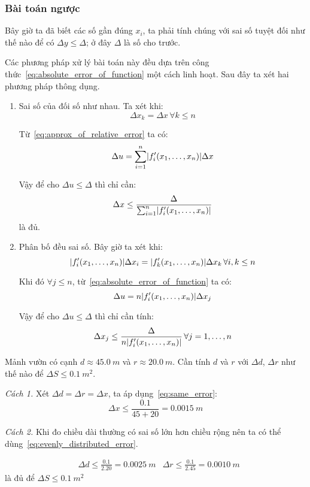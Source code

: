 \documentclass[../../Lectures.tex]{subfiles}
\begin{document}
\subsubsection{Bài toán ngược}

Bây giờ ta đã biết các số gần đúng \(x_i\), ta phải tính chúng với sai số tuyệt
đối như thế nào để có \(\Delta y \leq \Delta\); ở đây \(\Delta\) là số cho
trước.

Các phương pháp xử lý bài toán này đều dựa trên công thức~\ref{eq:absolute_error_of_function}
một cách linh hoạt. Sau đây ta xét hai phương pháp thông dụng.

\begin{enumerate}
    \item Sai số của  đối số như nhau.
        Ta xét khi:
        \[\Delta x_k = \Delta x \, \forall k \leq n\]

        Từ~\ref{eq:approx_of_relative_error} ta có:
        \[\Delta u = \sum_{i=1}^{n} \lvert f'_i(x_1, \ldots, x_n)\rvert \Delta x\]

        Vậy để cho \(\Delta u \leq \Delta\) thì chỉ cần:
        \begin{equation}\label{eq:same_error}
            \Delta x \leq \frac{\Delta}{\sum_{i=1}^{n} \lvert f'_i(x_1, \ldots, x_n)\rvert}
        \end{equation}
        là đủ.

    \item Phân bố đều sai số.
        Bây giờ ta xét khi:
        \[\lvert f'_i(x_1, \ldots, x_n)\rvert \Delta x_i = \lvert f'_k(x_1, \ldots, x_n)\rvert \Delta x_k \, \forall i, k \leq n\]

        Khi đó \(\forall j \leq n\), từ~\ref{eq:absolute_error_of_function} ta có:
        \[\Delta u = n \lvert f'_i(x_1, \ldots, x_n)\rvert \Delta x_j\]

        Vậy để cho \(\Delta u \leq \Delta\) thì chỉ cần tính:
        \begin{equation}\label{eq:evenly_distributed_error}
            \Delta x_j \leq \frac{\Delta}{n \lvert f'_i(x_1, \ldots, x_n)\rvert} \, \forall j = 1, \ldots, n
        \end{equation}
\end{enumerate}

\begin{exmp}
    Mảnh vườn có cạnh \(d \approx \SI{45.0}{m}\) và \(r \approx
    \SI{20.0}{m}\). Cần tính \(d\) và \(r\) với \(\Delta d\), \(\Delta r\) như
    thế nào để \(\Delta S \leq \SI{0.1}{m^2}\).

    \emph{Cách 1.}
    Xét \(\Delta d = \Delta r = \Delta x\), ta áp dụng~\ref{eq:same_error}:
    \[\Delta x \leq \frac{\num{0.1}}{45 + 20} = \SI{0.0015}{m}\]

    \emph{Cách 2.}
    Khi đo chiều dài thường có sai số lớn hơn chiều rộng nên ta có thể
    dùng~\ref{eq:evenly_distributed_error}.

    \[\begin{aligned}
        &\Delta d \leq \frac{\num{0.1}}{\num{2.20}} = \SI{0.0025}{m}
        &\Delta r \leq \frac{\num{0.1}}{\num{2.45}} = \SI{0.0010}{m}
    \end{aligned}\]
    là đủ để \(\Delta S \leq \SI{0.1}{m^2}\)
\end{exmp}
\end{document}
